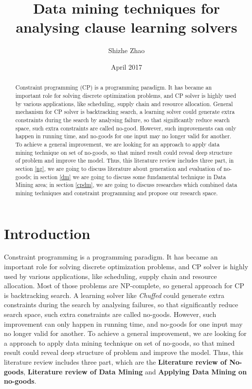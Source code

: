 \documentclass{article}
\title{Data mining techniques for analysing clause learning solvers}
\author{Shizhe Zhao}
\date{April 2017}
\begin{document}
\maketitle

\begin{abstract}
Constraint programming (CP) is a programming paradigm. It has became an important role for solving discrete optimization problems, and CP solver is highly used by various applications, like scheduling, supply chain and resource allocation. General mechanism for CP solver is backtracking search, a learning solver could generate extra constraints during the search by analysing failure, so that significantly reduce search space, such extra constraints are called no-good. However, such improvements can only happen in running time, and no-goods for one input may no longer valid for another. To achieve a general improvement, we are looking for an approach to apply data mining technique on set of no-goods, so that mined result could reveal deep structure of problem and improve the model. Thus, this literature review includes three part, in section \ref{ng}, we are going to discuss literature about generation and evaluation of no-goods; in section \ref{dm} we are going to discuss some fundamental technique in Data Mining area; in section \ref{cpdm}, we are going to discuss researches which combined data mining techniques and constraint programming and propose our research space.
\end{abstract}

\section{Introduction}

Constraint programming is a programming paradigm. It has became an important role for solving discrete optimization problems, and CP solver is highly used by various applications, like scheduling, supply chain and resource allocation. Most of those problems are NP-complete, so general approach for CP is backtracking search. A learning solver like \textit{Chuffed} \cite{chu2013improving} could generate extra constraints during the search by analysing failures, so that significantly reduce search space, such extra constraints are called no-goods. However, such improvement can only happen in running time, and no-goods for one input may no longer valid for another. To achieve a general improvement, we are looking for a approach to apply data mining technique on set of no-goods, so that mined result could reveal deep structure of problem and improve the model. Thus, this literature review includes three part, which are the \textbf{Literature review of No-goods}, \textbf{Literature review of Data Mining} and \textbf{Applying Data Mining on no-goods}.
\end{document}
